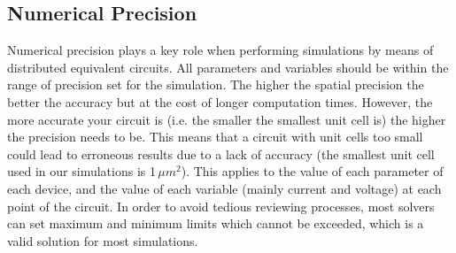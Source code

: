 
\subsection{Numerical Precision}
Numerical precision plays a key role when performing simulations by means of distributed equivalent circuits. All parameters and variables should be within the range of precision set for the simulation. The higher the spatial precision the better the accuracy but at the cost of longer computation times. However, the more accurate your circuit is (i.e. the smaller the smallest unit cell is) the higher the precision needs to be. This means that a circuit with unit cells too small could lead to erroneous results due to a lack of accuracy (the smallest unit cell used in our simulations is 1\,$\mu{}m^2$). This applies to the value of each parameter of each device, and the value of each variable (mainly current and voltage) at each point of the circuit. In order to avoid tedious reviewing processes, most solvers can set maximum and minimum limits which cannot be exceeded, which is a valid solution for most simulations.